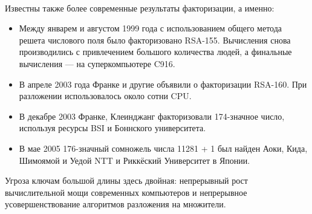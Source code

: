   \paragraph{} Известны также более современные результаты факторизации, а именно:  
    \begin{itemize}
      \item Между январем и августом 1999 года с использованием общего метода решета числового поля было факторизовано RSA-155. Вычисления снова производились с 
	привлечением большого количества людей, а финальные вычисления — на суперкомпьютере C916.
      \item В апреле 2003 года Франке и другие объявили о факторизации RSA-160. При разложении использовалось около сотни CPU.
      \item В декабре 2003 Франке, Клеинджанг факторизовали 174-значное число, используя ресурсы BSI и Боннского университета.
      \item В мае 2005 176-значный сомножель числа 11281 + 1 был найден Аоки, Кида, Шимоямой и Уедой NTT и Риккёский Университет в Японии.
    \end{itemize}
  
  Угроза ключам большой длины здесь двойная: непрерывный рост вычислительной мощи современных компьютеров и непрерывное 
  усовершенствование алгоритмов разложения на множители.



